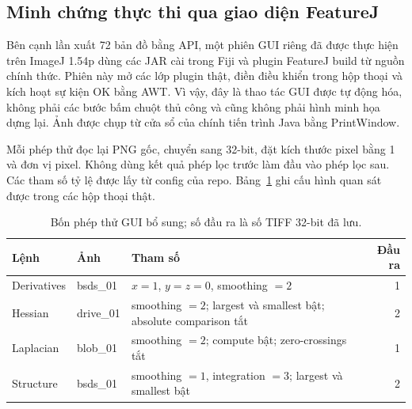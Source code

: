 \subsection{Minh chứng thực thi qua giao diện FeatureJ}
\label{sec:gui_evidence}
Bên cạnh lần xuất 72 bản đồ bằng API, một phiên GUI riêng đã được thực hiện
trên ImageJ 1.54p dùng các JAR cài trong Fiji và plugin FeatureJ build từ nguồn
chính thức. Phiên này mở các lớp plugin thật, điền điều khiển trong hộp thoại
và kích hoạt sự kiện OK bằng AWT. Vì vậy, đây là thao tác GUI được tự động hóa,
không phải các bước bấm chuột thủ công và cũng không phải hình minh họa dựng lại.
Ảnh được chụp từ cửa sổ của chính tiến trình Java bằng PrintWindow.

Mỗi phép thử đọc lại PNG gốc, chuyển sang 32-bit, đặt kích thước pixel bằng 1
và đơn vị pixel. Không dùng kết quả phép lọc trước làm đầu vào phép lọc sau.
Các tham số tỷ lệ được lấy từ config của repo. Bảng~\ref{tab:gui_parameters}
ghi cấu hình quan sát được trong các hộp thoại thật.

\begin{table}[t]
\centering
\caption{Bốn phép thử GUI bổ sung; số đầu ra là số TIFF 32-bit đã lưu.}
\label{tab:gui_parameters}
\begin{tabular}{llp{8cm}r}
\toprule
Lệnh & Ảnh & Tham số & Đầu ra\\
\midrule
Derivatives & bsds\_01 & $x=1$, $y=z=0$, smoothing $=2$ & 1\\
Hessian & drive\_01 & smoothing $=2$; largest và smallest bật; absolute comparison tắt & 2\\
Laplacian & blob\_01 & smoothing $=2$; compute bật; zero-crossings tắt & 1\\
Structure & bsds\_01 & smoothing $=1$, integration $=3$; largest và smallest bật & 2\\
\bottomrule
\end{tabular}
\end{table}

